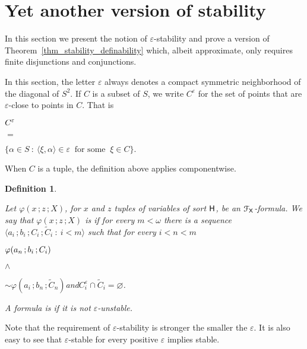 \documentclass{amsproc}
\newcounter{thm}
\theoremstyle{mio}
\newtheorem{definition}[thm]{Definition}\tcolorboxenvironment{definition}{mythm}
\renewcommand*{\emph}[1]{%
   \smash{\tikz[baseline]\node[rectangle, fill=teal!25, rounded corners, inner xsep=0.5ex, inner ysep=0.2ex, anchor=base, minimum height = 2.7ex]{\strut #1};}}
\begin{document}
\section{Yet another version of stability}
\def\medrel#1{\parbox{5ex}{\hfil $#1$}}
\def\ceq#1#2#3{\parbox[t]{28ex}{$\displaystyle #1$}\medrel{#2}{$\displaystyle #3$}}

In this section we present the notion of $\varepsilon$-stability and prove a version of Theorem~\ref{thm_stability_definability} which, albeit approximate,  only requires finite disjunctions and conjunctions.

In this section, the letter $\varepsilon$ always denotes a compact symmetric neighborhood of the diagonal of $S^2$.
If $C$ is a subset of $S$, we write $C^\varepsilon$ for the set of points that are $\varepsilon$-close to points in $C$.
That is

\ceq{\hfill C^\varepsilon}{=}{\big\{\alpha\in S\ :\ \langle\xi,\alpha\rangle\in \varepsilon\ \text{ for some }\ \xi\in C\big\}.}

When $C$ is a tuple, the definition above applies componentwise.

\begin{definition}\label{def_epsilon_stable}\strut
  Let $\varphi(x\,;z\,;X)$, for $x$ and $z$ tuples of variables of sort ${\sf H}$, be an ${\EuScript F}_{\sf X}$-for\-mu\-la.
  We say that $\varphi(x\,;z\,;X)$ is \emph{$\varepsilon$-unstable\/} if for every $m<\omega$ there is a sequence $\langle a_i\,;b_i\,;C_i\,;\tilde C_i\ :\ i<m\rangle$ such that for every $i<n<m$\smallskip

    \ceq{\hfill \varphi(a_n\,;b_i\,;C_i)}{\wedge}{{\sim}\varphi(a_i\,;b_n\,;\tilde C_n)}\quad and\quad $C_i^\varepsilon\cap\tilde C_i=\varnothing$.\smallskip

  A formula is \emph{$\varepsilon$-stable\/} if it is not $\varepsilon$-unstable.  
\end{definition}

Note that the requirement of $\varepsilon$-stability is stronger the smaller the $\varepsilon$.
It is also easy to see that $\varepsilon$-stable for every positive $\varepsilon$ implies stable.
\end{document}

